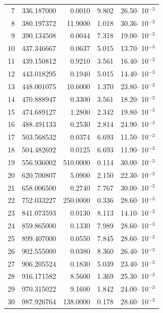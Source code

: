 \begin{longtable}{rrrrr}
7     &   336.187000&    0.0010&  9.802&   26.50$\cdot$ 10$^{-3}$\\
8     &   380.197372&   11.9000&  1.018&   30.36$\cdot$ 10$^{-3}$\\
9     &   390.134508&    0.0044&  7.318&   19.00$\cdot$ 10$^{-3}$\\
10    &   437.346667&    0.0637&  5.015&   13.70$\cdot$ 10$^{-3}$\\
11    &   439.150812&    0.9210&  3.561&   16.40$\cdot$ 10$^{-3}$\\
12    &   443.018295&    0.1940&  5.015&   14.40$\cdot$ 10$^{-3}$\\
13    &   448.001075&   10.6000&  1.370&   23.80$\cdot$ 10$^{-3}$\\
14    &   470.888947&    0.3300&  3.561&   18.20$\cdot$ 10$^{-3}$\\
15    &   474.689127&    1.2800&  2.342&   19.80$\cdot$ 10$^{-3}$\\
16    &   488.491133&    0.2530&  2.814&   24.90$\cdot$ 10$^{-3}$\\
17    &   503.568532&    0.0374&  6.693&   11.50$\cdot$ 10$^{-3}$\\
18    &   504.482692&    0.0125&  6.693&   11.90$\cdot$ 10$^{-3}$\\
19    &   556.936002&  510.0000&  0.114&   30.00$\cdot$ 10$^{-3}$\\
20    &   620.700807&    5.0900&  2.150&   22.30$\cdot$ 10$^{-3}$\\
21    &   658.006500&    0.2740&  7.767&   30.00$\cdot$ 10$^{-3}$\\
22    &   752.033227&  250.0000&  0.336&   28.60$\cdot$ 10$^{-3}$\\
23    &   841.073593&    0.0130&  8.113&   14.10$\cdot$ 10$^{-3}$\\
24    &   859.865000&    0.1330&  7.989&   28.60$\cdot$ 10$^{-3}$\\
25    &   899.407000&    0.0550&  7.845&   28.60$\cdot$ 10$^{-3}$\\
26    &   902.555000&    0.0380&  8.360&   26.40$\cdot$ 10$^{-3}$\\
27    &   906.205524&    0.1830&  5.039&   23.40$\cdot$ 10$^{-3}$\\
28    &   916.171582&    8.5600&  1.369&   25.30$\cdot$ 10$^{-3}$\\
29    &   970.315022&    9.1600&  1.842&   24.00$\cdot$ 10$^{-3}$\\
30    &   987.926764&  138.0000&  0.178&   28.60$\cdot$ 10$^{-3}$\\
\hline
\end{longtable}


